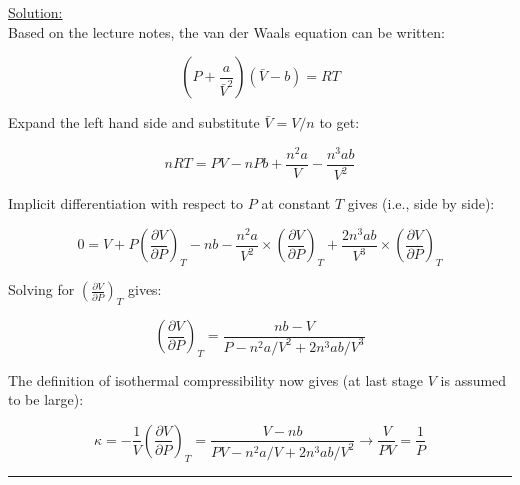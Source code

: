 \noindent
\underline{Solution:}\\

Based on the lecture notes, the van der Waals equation can be written:

$$\left(P + \frac{a}{\bar{V}^2}\right)\left(\bar{V} - b\right) = RT$$

Expand the left hand side and substitute $\bar{V} = V/n$ to get:

$$nRT = PV - nPb + \frac{n^2a}{V} - \frac{n^3ab}{V^2}$$

Implicit differentiation with respect to $P$ at constant $T$ gives (i.e., side by side):

$$0 = V + P\left(\frac{\partial V}{\partial P}\right)_T - nb - \frac{n^2a}{V^2}\times\left(\frac{\partial V}{\partial P}\right)_T + \frac{2n^3ab}{V^3}\times\left(\frac{\partial V}{\partial P}\right)_T$$

Solving for $\left(\frac{\partial V}{\partial P}\right)_T$ gives:

$$\left(\frac{\partial V}{\partial P}\right)_T = \frac{nb - V}{P - n^2a/V^2 + 2n^3ab/V^3}$$

The definition of isothermal compressibility now gives (at last stage $V$ is assumed to be large):

$$\kappa = -\frac{1}{V}\left(\frac{\partial V}{\partial P}\right)_T = \frac{V - nb}{PV - n^2a/V + 2n^3ab/V^2} \rightarrow \frac{V}{PV} = \frac{1}{P}$$

\hrule\vspace{0.5cm}
